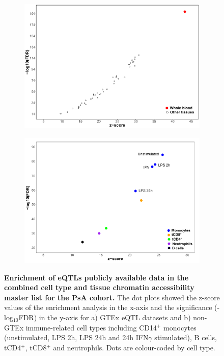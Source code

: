 \bigskip
\begin{figure}[H]
\centering
\begin{subfigure}[b]{0.5\textwidth}
\centering 
\includegraphics[width=\textwidth]{./Results3/pdfs/ATAC_PSA_all_GTeX_eQTL_enrichment_dotplot}
\caption{}
\end{subfigure}%
\begin{subfigure}[b]{0.5\textwidth} 
\centering
\includegraphics[width=\textwidth]{./Results3/pdfs/ATAC_PSA_all_Jknight_eQTL_enrichment_dotplot}
\caption{}
\end{subfigure}
\caption[Enrichment of eQTLs publicly available data in the combined cell type and tissue chromatin accessibility master list for the PsA cohort.]{\textbf{Enrichment of eQTLs publicly available data in the combined cell type and tissue chromatin accessibility master list for the PsA cohort.} The dot plots showed the z-score values of the enrichment analysis in the x-axis and the significance (-log${_10}$FDR) in the y-axis for a) GTEx eQTL datasets and b) non-GTEx immune-related cell types including CD14$^+$ monocytes (unstimulated, LPS 2h, LPS 24h and 24h IFN$\gamma$ stimulated), B cells, tCD4$^+$, tCD8$^+$ and neutrophils. Dots are colour-coded by cell type.}
\label{figure:PsA_FAST_ATAC_eQTL_enrichment}
\end{figure}



